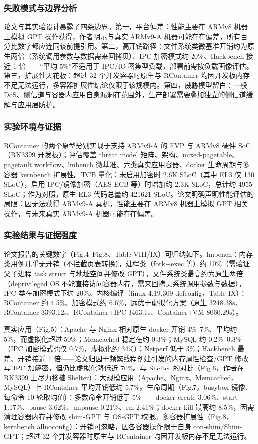 \documentclass[11pt]{ctexart}
\begin{document}
\subsubsection{失败模式与边界分析}
论文与其实验设计暴露了四条边界。第一，平台偏差：性能主要在 ARMv8 机器上模拟 GPT 操作获得，作者明示与真实 ARMv9-A 机器可能存在偏差，所有百分比数字都应连同该前提引用。第二，高开销路径：文件系统类微基准开销约为原生两倍（系统调用参数与数据需来回拷贝）、IPC 加密模式约 20\%、Hackbench 接近 1 倍——“平均 5\%”不适用于 IPC/IO 密集型负载，部署前需按负载画像评估。第三，扩展性天花板：超过 32 个并发容器时原生与 RContainer 均因开发板内存不足无法运行，多容器扩展性结论仅限于该规模内。第四，威胁模型留白：一般 DoS、侧信道与容器内应用自身漏洞在范围外，生产部署需要叠加独立的侧信道缓解与应用层防护。\par
\subsubsection{实验环境与证据}
RContainer 的两个原型分别实现于支持 ARMv9-A 的 FVP 与 ARMv8 硬件 SoC（RK3399 开发板）；评估覆盖 threat model 矩阵、架构、mixed-pagetable、pagefault workflow、lmbench 微基准、六类真实应用容器、docker 生命周期与多容器 kernbench 扩展性。TCB 量化：未启用加密时 2.6K SLoC（其中 EL3 仅 130 SLoC），启用 IPC/镜像加密（AES-ECB 等）时增加约 2.3K SLoC，总计约 4955 SLoC；作为对照，原生 EL3 代码总量约 421621 SLoC。论文明确声明性能评估的局限：因无法获得 ARMv9-A 真机，性能主要在 ARMv8 机器上模拟 GPT 相关操作，与未来真实 ARMv9-A 机器可能存在偏差。\par
\subsubsection{实验结果与证据强度}
论文报告的关键数字（Fig.4--Fig.8、Table VIII/IX）可归纳如下。lmbench：内存类用例几乎无开销（不拦截页表转换），进程类（fork+exec 等）约 10\%（需验证父子进程 task struct 与地址空间并修改 GPT），文件系统类最高约为原生两倍（deprivileged OS 不能直接访问容器内存，需来回拷贝系统调用参数与数据），IPC 类在加密模式下约 20\%。内核编译（linux-4.19.309 defconfig，Table IX）：RContainer 约 4.5\%、加密模式约 6.6\%，远优于虚拟化方案（原生 3248.38s、RContainer 3393.12s、RContainer+IPC 3463.1s、Container+VM 8060.29s）。\par
真实应用（Fig.5）：Apache 与 Nginx 相对原生 docker 开销 4\%--7\%、平均约 5\%，而虚拟化超过 50\%；Memcached 稳定在约 0.3\%；MySQL 约 0.2\%--0.3\%（IPC 加密模式也仅 0.7\%，虚拟化约 34\%）；Netperf 低于 3\%；Hackbench 最差、开销接近 1 倍——论文归因于频繁线程创建引发的内存属性检查/GPT 修改与 IPC 加解密，但仍比虚拟化降低近 70\%。与 Shelter 的对比（Fig.6，作者在 RK3399 上尽力移植 Shelter）：大规模应用（Apache、Nginx、Memcached、MySQL）上 RContainer 平均开销低约 5.7\%。生命周期（Fig.7，busybox 镜像、每命令 10 轮取均值）：多数命令开销低于 5\%——docker create 3.06\%、start 1.17\%、pause 3.62\%、unpause 0.21\%、rm 2.41\%；docker kill 最高约 8.5\%，因需清理容器内存并修改 shim-GPT 与 OS-GPT 权限。多容器扩展性（Fig.8，kernbench allnoconfig）：开销可忽略，因各容器操作限于自身 con-shim/Shim-GPT；超过 32 个并发容器时原生与 RContainer 均因开发板内存不足无法运行。\par
\end{document}
